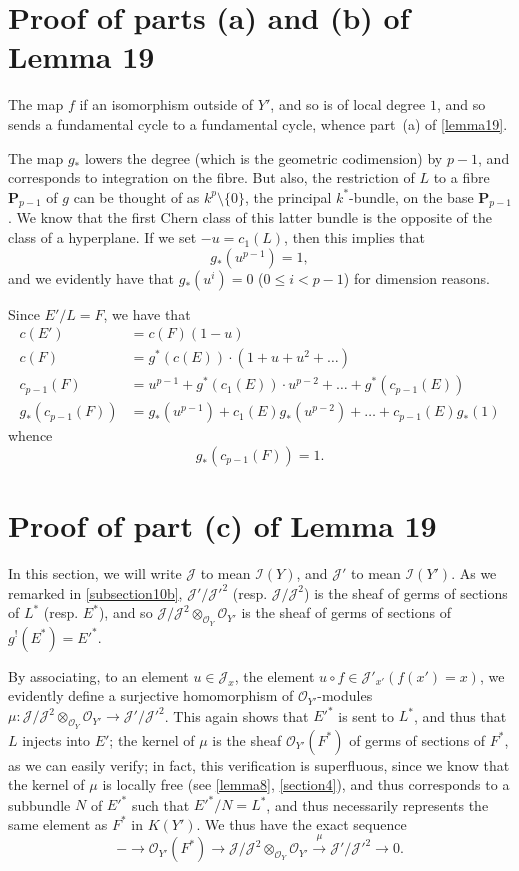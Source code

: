 \documentclass{article}
\theoremstyle{plain}
\theoremstyle{definition}
\newcommand{\sh}{\mathscr}
\newcommand{\PP}{\mathbf{P}}
\renewcommand{\leq}{\leqslant}
\newcommand{\oldpage}[1]{\marginpar{\footnotesize$\Big\vert$ \textit{p.~#1}}}
\begin{document}
\section{Proof of parts (a) and (b) of Lemma 19}
\label{section14}

The map $f$ if an isomorphism outside of $Y'$, and so is of local degree $1$, and so sends a fundamental cycle to a fundamental cycle, whence part~(a) of \cref{lemma19}.

The map $g_*$ lowers the degree (which is the geometric codimension) by $p-1$, and corresponds to integration on the fibre.
But also, the restriction of $L$ to a fibre $\PP_{p-1}$ of $g$ can be thought of as $k^p\setminus\{0\}$, the principal $k^*$-bundle, on the base $\PP_{p-1}$.
We know that the first Chern class of this latter bundle is the opposite of the class of a hyperplane.
If we
\oldpage{130}
set $-u=c_1(L)$, then this implies that
\[
  g_*(u^{p-1}) = 1,
\]
and we evidently have that $g_*(u^i)=0$ ($0\leq i<p-1$) for dimension reasons.

Since $E'/L=F$, we have that
\begin{align*}
  c(E') &= c(F)(1-u)
\\c(F) &= g^*(c(E))\cdot(1+u+u^2+\ldots)
\\c_{p-1}(F) &= u^{p-1}+g^*(c_1(E))\cdot u^{p-2} +\ldots+ g^*(c_{p-1}(E))
\\g_*(c_{p-1}(F)) &= g_*(u^{p-1})+c_1(E)g_*(u^{p-2}) +\ldots+ c_{p-1}(E)g_*(1)
\end{align*}
whence
\[
  g_*(c_{p-1}(F)) = 1.
\]


\section{Proof of part (c) of Lemma 19}
\label{section15}

In this section, we will write $\sh{J}$ to mean $\sh{I}(Y)$, and $\sh{J}'$ to mean $\sh{I}(Y')$.
As we remarked in \cref{subsection10b}, $\sh{J}'/\sh{J}'^2$ (resp. $\sh{J}/\sh{J}^2$) is the sheaf of germs of sections of $L^*$ (resp. $E^*$), and so $\sh{J}/\sh{J}^2\otimes_{\sh{O}_Y}\sh{O}_{Y'}$ is the sheaf of germs of sections of $g^!(E^*)=E'^*$.

By associating, to an element $u\in\sh{J}_x$, the element $u\circ f\in\sh{J}'_{x'}(f(x')=x)$, we evidently define a surjective homomorphism of $\sh{O}_{Y'}$-modules $\mu\colon\sh{J}/\sh{J}^2\otimes_{\sh{O}_Y}\sh{O}_{Y'}\to\sh{J}'/\sh{J}'^2$.
This again shows that $E'^*$ is sent to $L^*$, and thus that $L$ injects into $E'$;
the kernel of $\mu$ is the sheaf $\sh{O}_{Y'}(F^*)$ of germs of sections of $F^*$, as we can easily verify;
in fact, this verification is superfluous, since we know that the kernel of $\mu$ is locally free (see \cref{lemma8}, \cref{section4}), and thus corresponds to a subbundle $N$ of $E'^*$ such that $E'^*/N=L^*$, and thus necessarily represents the same element as $F^*$ in $K(Y')$.
We thus have the exact sequence
\[
\label{section15equation1}
  - \to \sh{O}_{Y'}(F^*) \to \sh{J}/\sh{J}^2\otimes_{\sh{O}_Y}\sh{O}_{Y'} \xrightarrow{\mu} \sh{J}'/\sh{J}'^2 \to 0.
  \tag{1}
\]
\end{document}
